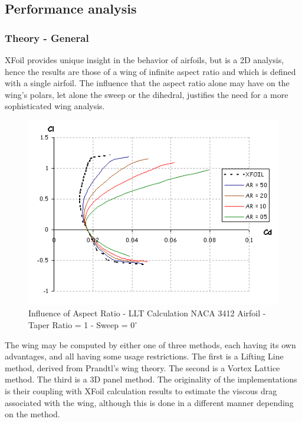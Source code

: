 \documentclass[a4paper,twoside,12pt,dvips]{article}
\begin{document}
\subsection{Performance analysis}

\subsubsection{Theory - General}

XFoil provides unique insight in the behavior of airfoils, but is a 2D
analysis, hence the results are those of a wing of infinite aspect
ratio and which is defined with a single airfoil. The influence that
the aspect ratio alone may have on the wing's polars, let alone the
sweep or the dihedral, justifies the need for a more sophisticated
wing analysis.

\begin{figure}[htbp]
  \includegraphics[width=0.8\linewidth]{img-15}\centering 
  \caption{Influence of Aspect Ratio - LLT Calculation NACA 3412 Airfoil - Taper Ratio = 1 - Sweep = $0^\circ$}
  \label{fig:influence_of_aspect_ratio}
\end{figure}

The wing may be computed by either one of three methods, each having
its own advantages, and all having some usage restrictions. \newline
The first is a Lifting Line method, derived from Prandtl's wing
theory. The second is a Vortex Lattice method. The third is a 3D panel
method.\newline
The originality of the implementations is their coupling with XFoil
calculation results to estimate the viscous drag associated with the
wing, although this is done in a different manner depending on the
method.
\end{document}

